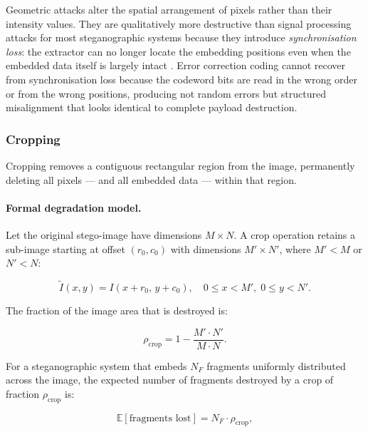 \documentclass[12pt,a4paper,oneside]{report}
\begin{document}
	Geometric attacks alter the spatial arrangement of pixels rather than their intensity values.
	They are qualitatively more destructive than signal processing attacks for most steganographic
	systems because they introduce \emph{synchronisation loss}: the extractor can no longer locate
	the embedding positions even when the embedded data itself is largely intact
	\cite{ruanaidh1998rotation, cox2007digital}. Error correction coding cannot recover from
	synchronisation loss because the codeword bits are read in the wrong order or from the wrong
	positions, producing not random errors but structured misalignment that looks identical to
	complete payload destruction.
	
	\subsubsection{Cropping}
	
	Cropping removes a contiguous rectangular region from the image, permanently deleting all
	pixels — and all embedded data — within that region.
	
	\paragraph{Formal degradation model.}
	Let the original stego-image have dimensions $M \times N$. A crop operation retains a
	sub-image starting at offset $(r_0, c_0)$ with dimensions $M' \times N'$, where
	$M' < M$ or $N' < N$:
	
	\begin{equation}
		\tilde{I}(x,y) = I(x + r_0,\, y + c_0), \quad
		0 \leq x < M',\; 0 \leq y < N'.
		\label{eq:crop}
	\end{equation}
	
	The fraction of the image area that is destroyed is:
	
	\begin{equation}
		\rho_\text{crop} = 1 - \frac{M' \cdot N'}{M \cdot N}.
		\label{eq:crop_fraction}
	\end{equation}
	
	For a steganographic system that embeds $N_F$ fragments uniformly distributed across the image,
	the expected number of fragments destroyed by a crop of fraction $\rho_\text{crop}$ is:
	
	\begin{equation}
		\mathbb{E}[\text{fragments lost}] = N_F \cdot \rho_\text{crop},
		\label{eq:crop_fragments}
	\end{equation}
	
\end{document}
